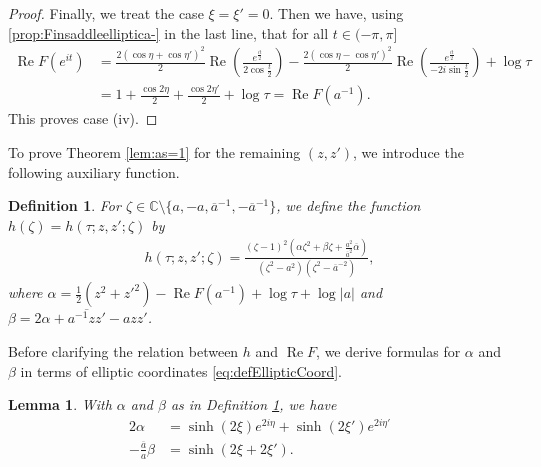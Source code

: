 \documentclass[%
 jmp,
cp,  %
 amsmath,amsthm,amssymb,%
 reprint,%
onecolumn]{revtex4-2}
\newtheorem{lemma}[theorem]{Lemma}
\newtheorem{definition}[theorem]{Definition}
\begin{document}
\begin{proof}
Finally, we treat the case $\xi=\xi'=0$. Then we have, using \eqref{prop:Finsaddleelliptica-} in the last line, that for all $t\in (-\pi,\pi]$
\begin{align*}
\operatorname{Re} F(e^{it}) &= \frac{2(\cos\eta+\cos\eta')^2}{2} \operatorname{Re}\left(\frac{e^\frac{it}{2}}{2 \cos\frac{t}{2}}\right) 
- \frac{2(\cos\eta-\cos\eta')^2}{2} \operatorname{Re}\left(\frac{e^\frac{it}{2}}{-2 i \sin\frac{t}{2}}\right) + \log\tau\\
&= 1 + \frac{\cos 2\eta}{2} + \frac{\cos 2\eta'}{2}+\log\tau= \operatorname{Re} F(a^{-1}).
\end{align*}
This proves case (iv). 
\end{proof}

To prove Theorem \ref{lem:as=1} for the remaining $(z,z')$, we introduce the following auxiliary function. 

\begin{definition} \label{def:defh}
For $\zeta\in \mathbb C\setminus \{a, - a, \overline a^{-1}, -\overline a^{-1}\}$, we define the function $h(\zeta)=h(\tau;z,z';\zeta)$ by
\begin{align}
h(\tau;z,z';\zeta) = \frac{(\zeta-1)^2 (\alpha \zeta^2+\beta \zeta+\frac{a^2}{\overline a^2} \overline \alpha)}{(\zeta^2-a^2)(\zeta^2-\overline a^{-2})},
\end{align}
where $\alpha = \frac{1}{2}(z^2+z'^2)- \operatorname{Re} F(a^{-1}) + \log \tau + \log |a|$ and $\beta =  2 \alpha +  \overline{a^{-1} z z'} - a z z'$.\\
\end{definition}

Before clarifying the relation between $h$ and $\operatorname{Re} F$, we derive formulas for $\alpha$ and $\beta$ in terms of elliptic coordinates \eqref{eq:defEllipticCoord}. 

\begin{lemma} \label{lem:formulasalphabeta}
With $\alpha$ and $\beta$ as in Definition \ref{def:defh}, we have
\begin{align*} 2\alpha &= \sinh(2\xi) e^{2i\eta} + \sinh(2\xi') e^{2i\eta'}\\
-\frac{\overline a}{a} \beta &= \sinh(2\xi+2\xi'). 
\end{align*}
\end{lemma}
\end{document}
